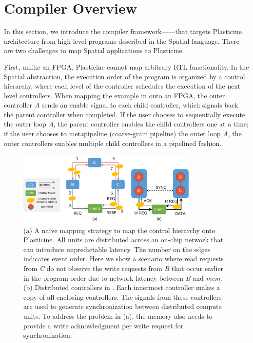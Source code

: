 \section{\name Compiler Overview} \label{sec:compileroverview}

In this section, we introduce the compiler framework---\name---that targets Plasticine
architecture from high-level programs described in the Spatial language. 
There are two challenges to map Spatial applications to Plasticine. 

First, unlike an FPGA, Plasticine cannot map arbitrary RTL functionality.
In the Spatial abstraction, the execution order of the program is organized by a control hierarchy, where
each level of the controller schedules the execution of the next level controllers.
When mapping the example in  onto an FPGA, the outer controller \emph{A}
sends an enable signal to each child controller, which signals back the parent controller when
completed. If the user chooses to sequentially execute the outer loop \emph{A}, the parent
controller enables the child controllers one at a time; if the user chooses to metapipeline
(coarse-grain pipeline) the outer loop \emph{A}, the outer controllers enables multiple child controllers in a pipelined fashion.

\begin{figure}
\centering
  \centering
\includegraphics[width=0.8\textwidth]{figs/centralctrl.pdf}
\caption{
  (a) A na\"ive mapping strategy to map the control hierarchy onto Plasticine.
  All units are distributed across an on-chip network that can introduce unpredictable latency.
  The number on the edges indicates event order.
  Here we show a scenario where read requests from \emph{C} do not observe the write requests from
  \emph{B} that occur earlier in the program order due to network latency between \emph{B} and
  \emph{mem}.
  (b) Distributed controllers in \name. Each innermost controller makes a copy of all enclosing controllers. The signals from these controllers are used to generate synchronization between distributed compute units. To address the problem in (a), the memory also needs to provide a write acknowledgment per write request for synchronization.
}
\label{fig:centralctrl}
\end{figure}

